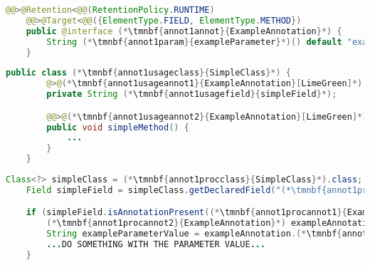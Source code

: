 \example
\begin{lstlisting}[language=Java, title={Annotation processed during runtime, applicable to fields and methods}]
    @@>@Retention<@@(RetentionPolicy.RUNTIME)
    @@>@Target<@@({ElementType.FIELD, ElementType.METHOD})
    public @interface (*\tmnbf{annot1annot}{ExampleAnnotation}*) {
        String (*\tmnbf{annot1param}{exampleParameter}*)() default "example default value";
    }
\end{lstlisting}
\begin{lstlisting}[language=Java, title={Annotation usage}]
    public class (*\tmnbf{annot1usageclass}{SimpleClass}*) {
        @>@(*\tmnbf{annot1usageannot1}{ExampleAnnotation}[LimeGreen]*)
        private String (*\tmnbf{annot1usagefield}{simpleField}*);

        @@>@(*\tmnbf{annot1usageannot2}{ExampleAnnotation}[LimeGreen]*)<@@((*\tmnbf{annot1usageparam}{exampleParameter}*) = "new value")
        public void simpleMethod() {
            ...
        }
    }
\end{lstlisting}
\begin{lstlisting}[language=Java, title={Runtime annotation processing}]
    Class<?> simpleClass = (*\tmnbf{annot1procclass}{SimpleClass}*).class;
    Field simpleField = simpleClass.getDeclaredField("(*\tmnbf{annot1procfield}{simpleField}[ForestGreen]*)");

    if (simpleField.isAnnotationPresent((*\tmnbf{annot1procannot1}{ExampleAnnotation}*).class)) {
        (*\tmnbf{annot1procannot2}{ExampleAnnotation}*) exampleAnnotation = simpleField.getAnnotation((*\tmnbf{annot1procannot3}{ExampleAnnotation}*).class);
        String exampleParameterValue = exampleAnnotation.(*\tmnbf{annot1procparam}{exampleParameter}*)();
        ...DO SOMETHING WITH THE PARAMETER VALUE...
    }
\end{lstlisting}
\newpage

